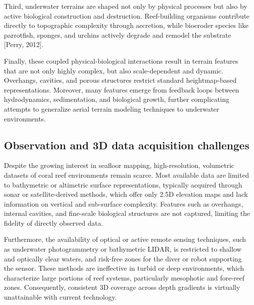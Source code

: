 Third, underwater terrains are shaped not only by physical processes but also by active biological construction and destruction. Reef-building organisms contribute directly to topographic complexity through accretion, while bioeroder species like parrotfish, sponges, and urchins actively degrade and remodel the substrate [Perry, 2012]. %

Finally, these coupled physical-biological interactions result in terrain features that are not only highly complex, but also scale-dependent and dynamic. Overhangs, cavities, and porous structures restrict standard heightmap-based representations. Moreover, many features emerge from feedback loops between hydrodynamics, sedimentation, and biological growth, further complicating attempts to generalize aerial terrain modeling techniques to underwater environments. %


\subsection{Observation and 3D data acquisition challenges}
Despite the growing interest in seafloor mapping, high-resolution, volumetric datasets of coral reef environments remain scarce. Most available data are limited to bathymetric or altimetric surface representations, typically acquired through sonar or satellite-derived methods, which offer only 2.5D elevation maps and lack information on vertical and sub-surface complexity. Features such as overhangs, internal cavities, and fine-scale biological structures are not captured, limiting the fidelity of directly observed data.

Furthermore, the availability of optical or active remote sensing techniques, such as underwater photogrammetry or bathymetric LIDAR, is restricted to shallow and optically clear waters, and risk-free zones for the diver or robot supporting the sensor. These methods are ineffective in turbid or deep environments, which characterize large portions of reef systems, particularly mesophotic and fore-reef zones. Consequently, consistent 3D coverage across depth gradients is virtually unattainable with current technology.

